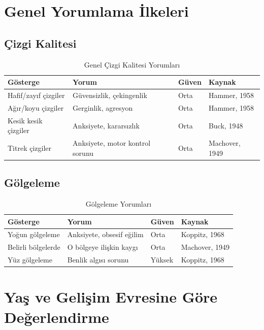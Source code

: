 \section{Genel Yorumlama İlkeleri}

\subsection{Çizgi Kalitesi}

\begin{table}[H]
\centering
\caption{Genel Çizgi Kalitesi Yorumları}
\label{tab:cizgikal}
\begin{tabular}{p{3.5cm}p{5.5cm}p{2cm}p{2cm}}
\toprule
\textbf{Gösterge} & \textbf{Yorum} & \textbf{Güven} & \textbf{Kaynak} \\
\midrule
Hafif/zayıf çizgiler & Güvensizlik, çekingenlik & Orta & Hammer, 1958 \\
Ağır/koyu çizgiler & Gerginlik, agresyon & Orta & Hammer, 1958 \\
Kesik kesik çizgiler & Anksiyete, kararsızlık & Orta & Buck, 1948 \\
Titrek çizgiler & Anksiyete, motor kontrol sorunu & Orta & Machover, 1949 \\
\bottomrule
\end{tabular}
\end{table}

\subsection{Gölgeleme}

\begin{table}[H]
\centering
\caption{Gölgeleme Yorumları}
\label{tab:golge}
\begin{tabular}{p{3.5cm}p{5.5cm}p{2cm}p{2cm}}
\toprule
\textbf{Gösterge} & \textbf{Yorum} & \textbf{Güven} & \textbf{Kaynak} \\
\midrule
Yoğun gölgeleme & Anksiyete, obsesif eğilim & Orta & Koppitz, 1968 \\
Belirli bölgelerde & O bölgeye ilişkin kaygı & Orta & Machover, 1949 \\
Yüz gölgeleme & Benlik algısı sorunu & Yüksek & Koppitz, 1968 \\
\bottomrule
\end{tabular}
\end{table}

\section{Yaş ve Gelişim Evresine Göre Değerlendirme}

